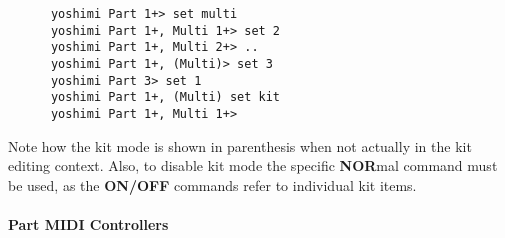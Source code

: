    \begin{verbatim}
      yoshimi Part 1+> set multi
      yoshimi Part 1+, Multi 1+> set 2
      yoshimi Part 1+, Multi 2+> ..
      yoshimi Part 1+, (Multi)> set 3
      yoshimi Part 3> set 1
      yoshimi Part 1+, (Multi) set kit
      yoshimi Part 1+, Multi 1+>
   \end{verbatim}

   Note how the kit mode is shown in parenthesis when not actually in the kit
   editing context. Also, to disable kit mode the specific \textbf{NOR}mal
   command must be used, as the \textbf{ON/OFF} commands refer to individual
   kit items.

\paragraph{Part MIDI Controllers}
\label{paragraph:command_line_part_midi_commands}
